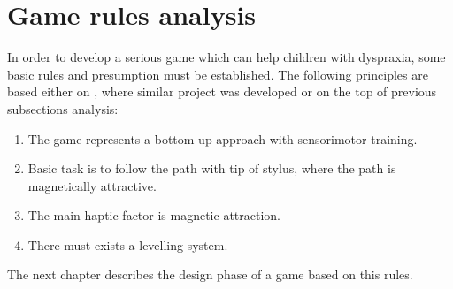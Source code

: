 \section{Game rules analysis}
\label{rules}
In order to develop a serious game which can help children with dyspraxia, some basic rules and presumption must be established. The following principles are based either on \cite{13}, where similar project was developed or on the top of previous subsections analysis:
\begin{enumerate} [noitemsep]
\item The game represents a bottom-up approach with sensorimotor training.
\item Basic task is to follow the path with tip of stylus, where the path is magnetically attractive.
\item The main haptic factor is magnetic attraction.
\item There must exists a levelling system.
\end{enumerate}

The next chapter describes the design phase of a game based on this rules. 